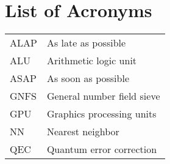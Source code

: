 \chapter*{List of Acronyms}

\begin{table}[ht]
\centering
\begin{tabular}{ll}
ALAP & As late as possible\\
ALU & Arithmetic logic unit\\
ASAP & As soon as possible\\
GNFS & General number field sieve \\
GPU & Graphics processing units\\
NN & Nearest neighbor\\
QEC & Quantum error correction\\

\end{tabular}
\end{table}

